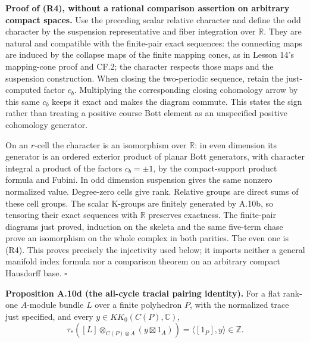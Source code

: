\documentclass[
  11pt,
]{article}
\begin{document}
\textbf{Proof of (R4), without a rational comparison assertion on
arbitrary compact spaces.} Use the preceding scalar relative character
and define the odd character by the suspension representative and fiber
integration over \(\mathbb R\). They are natural and compatible with the
finite-pair exact sequences: the connecting maps are induced by the
collapse maps of the finite mapping cones, as in Lesson 14's
mapping-cone proof and CF.2; the character respects those maps and the
suspension construction. When closing the two-periodic sequence, retain
the just-computed factor \(c_b\). Multiplying the corresponding closing
cohomology arrow by this same \(c_b\) keeps it exact and makes the
diagram commute. This states the sign rather than treating a positive
course Bott element as an unspecified positive cohomology generator.

On an \(r\)-cell the character is an isomorphism over \(\mathbb R\): in
even dimension its generator is an ordered exterior product of planar
Bott generators, with character integral a product of the factors
\(c_b=\pm1\), by the compact-support product formula and Fubini. In odd
dimension suspension gives the same nonzero normalized value.
Degree-zero cells give rank. Relative groups are direct sums of these
cell groups. The scalar K-groups are finitely generated by A.10b, so
tensoring their exact sequences with \(\mathbb R\) preserves exactness.
The finite-pair diagrams just proved, induction on the skeleta and the
same five-term chase prove an isomorphism on the whole complex in both
parities. The even one is (R4). This proves precisely the injectivity
used below; it imports neither a general manifold index formula nor a
comparison theorem on an arbitrary compact Hausdorff base. \(\square\)

\textbf{Proposition A.10d (the all-cycle tracial pairing identity).} For
a flat rank-one \(A\)-module bundle \(L\) over a finite polyhedron
\(P\), with the normalized trace just specified, and every
\(y\in KK_0(C(P),\mathbb C)\), \[
 \tau_*\!\left([L]\otimes_{C(P)\otimes A}
                                 (y\boxtimes1_A)\right)
             =\langle[1_P],y\rangle\in\mathbb Z .
 \tag{R8}
\]
\end{document}
